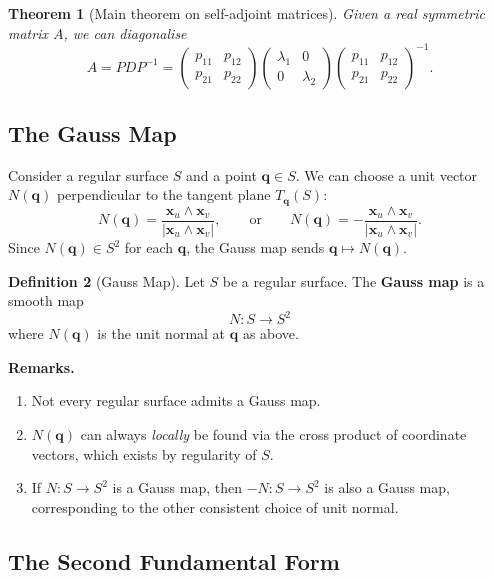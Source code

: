 \documentclass[10pt, a4paper]{article}
\theoremstyle{plain}
\newtheorem{theorem}{Theorem}[section]
\theoremstyle{definition}
\newtheorem{definition}[theorem]{Definition}
\theoremstyle{remark}
\begin{document}
\begin{theorem}[Main theorem on self-adjoint matrices]
  Given a real symmetric matrix $A$, we can diagonalise
  \[
    A = PDP^{-1}
    = \begin{pmatrix} p_{11} & p_{12} \\ p_{21} & p_{22} \end{pmatrix}
      \begin{pmatrix} \lambda_1 & 0 \\ 0 & \lambda_2 \end{pmatrix}
      \begin{pmatrix} p_{11} & p_{12} \\ p_{21} & p_{22} \end{pmatrix}^{-1}.
  \]
\end{theorem}

\subsection{The Gauss Map}

Consider a regular surface $S$ and a point $\mathbf{q} \in S$. We can choose a unit vector
$N(\mathbf{q})$ perpendicular to the tangent plane $T_{\mathbf{q}}(S)$:
\[
  N(\mathbf{q}) = \frac{\mathbf{x}_u \wedge \mathbf{x}_v}{|\mathbf{x}_u \wedge \mathbf{x}_v|},
  \qquad \text{or} \qquad
  N(\mathbf{q}) = -\frac{\mathbf{x}_u \wedge \mathbf{x}_v}{|\mathbf{x}_u \wedge \mathbf{x}_v|}.
\]
Since $N(\mathbf{q}) \in S^2$ for each $\mathbf{q}$, the Gauss map sends $\mathbf{q} \mapsto N(\mathbf{q})$.

\begin{definition}[Gauss Map]
  Let $S$ be a regular surface. The \textbf{Gauss map} is a smooth map
  \[
    N : S \to S^2
  \]
  where $N(\mathbf{q})$ is the unit normal at $\mathbf{q}$ as above.

  \textbf{Remarks.}
  \begin{enumerate}
    \item Not every regular surface admits a Gauss map.
    \item $N(\mathbf{q})$ can always \emph{locally} be found via the cross product of coordinate
    vectors, which exists by regularity of $S$.
    \item If $N: S \to S^2$ is a Gauss map, then $-N: S \to S^2$ is also a Gauss map,
    corresponding to the other consistent choice of unit normal.
  \end{enumerate}
\end{definition}

\subsection{The Second Fundamental Form}
\end{document}
